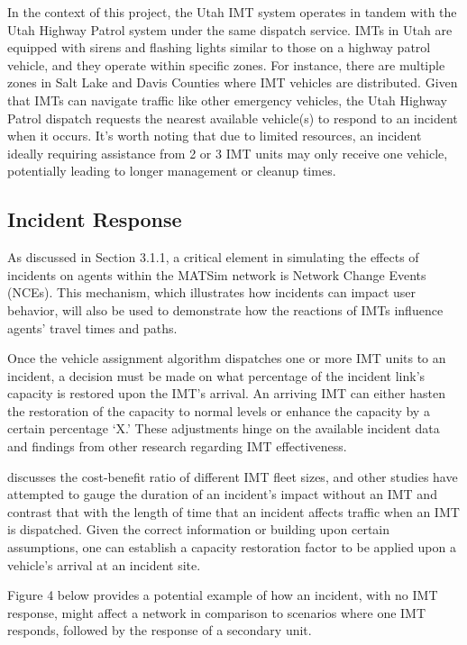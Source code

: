 \documentclass[
  letterpaper,
  authoryear]{elsarticle}
\begin{document}
In the context of this project, the Utah IMT system operates in tandem
with the Utah Highway Patrol system under the same dispatch service.
IMTs in Utah are equipped with sirens and flashing lights similar to
those on a highway patrol vehicle, and they operate within specific
zones. For instance, there are multiple zones in Salt Lake and Davis
Counties where IMT vehicles are distributed. Given that IMTs can
navigate traffic like other emergency vehicles, the Utah Highway Patrol
dispatch requests the nearest available vehicle(s) to respond to an
incident when it occurs. It's worth noting that due to limited
resources, an incident ideally requiring assistance from 2 or 3 IMT
units may only receive one vehicle, potentially leading to longer
management or cleanup times.

\hypertarget{incident-response}{%
\subsection{Incident Response}\label{incident-response}}

As discussed in Section 3.1.1, a critical element in simulating the
effects of incidents on agents within the MATSim network is Network
Change Events (NCEs). This mechanism, which illustrates how incidents
can impact user behavior, will also be used to demonstrate how the
reactions of IMTs influence agents' travel times and paths.

Once the vehicle assignment algorithm dispatches one or more IMT units
to an incident, a decision must be made on what percentage of the
incident link's capacity is restored upon the IMT's arrival. An arriving
IMT can either hasten the restoration of the capacity to normal levels
or enhance the capacity by a certain percentage `X.' These adjustments
hinge on the available incident data and findings from other research
regarding IMT effectiveness.

\citet{kim2012} discusses the cost-benefit ratio of different IMT fleet
sizes, and other studies have attempted to gauge the duration of an
incident's impact without an IMT and contrast that with the length of
time that an incident affects traffic when an IMT is dispatched. Given
the correct information or building upon certain assumptions, one can
establish a capacity restoration factor to be applied upon a vehicle's
arrival at an incident site.

Figure 4 below provides a potential example of how an incident, with no
IMT response, might affect a network in comparison to scenarios where
one IMT responds, followed by the response of a secondary unit.
\end{document}
